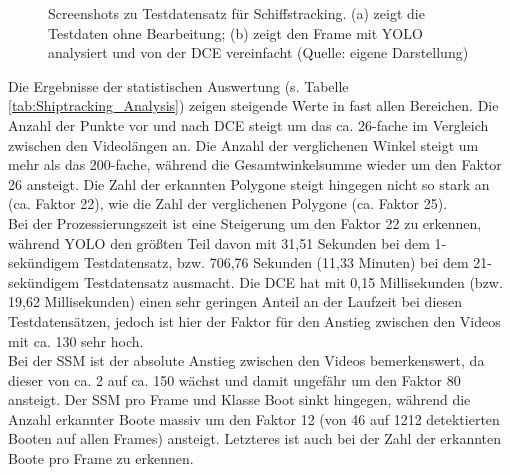 {\begin{figure}[ht]
\begin{subfigure}[b]{0.45\textwidth}
		\end{subfigure}
		\caption[Screenshots zu Testdatensatz für Schiffstracking]{Screenshots zu Testdatensatz für Schiffstracking. (a) zeigt die Testdaten ohne Bearbeitung; (b) zeigt den Frame mit YOLO analysiert und von der DCE vereinfacht (Quelle: eigene Darstellung)}
		\label{Scr:Testdatensatz_Shiptracking}
	\end{figure} 
	Die Ergebnisse der statistischen Auswertung (s. Tabelle \ref{tab:Shiptracking_Analysis}) zeigen steigende Werte in fast allen Bereichen. Die Anzahl der Punkte vor und nach DCE steigt um das ca. 26-fache im Vergleich zwischen den Videolängen an. Die Anzahl der verglichenen Winkel steigt um mehr als das 200-fache, während die Gesamtwinkelsumme wieder um den Faktor 26  ansteigt. Die Zahl der erkannten Polygone steigt hingegen nicht so stark an (ca. Faktor 22), wie die Zahl der verglichenen Polygone (ca. Faktor 25). \\
	Bei der Prozessierungszeit ist eine Steigerung um den Faktor 22 zu erkennen, während YOLO den größten Teil davon mit 31,51 Sekunden bei dem 1-sekündigem Testdatensatz, bzw. 706,76 Sekunden (11,33 Minuten) bei dem 21-sekündigem Testdatensatz ausmacht. Die DCE hat mit 0,15 Millisekunden (bzw. 19,62 Millisekunden) einen sehr geringen Anteil an der Laufzeit bei diesen Testdatensätzen, jedoch ist hier der Faktor für den Anstieg zwischen den Videos mit ca. 130 sehr hoch. \\
	Bei der SSM ist der absolute Anstieg zwischen den Videos bemerkenswert, da dieser von ca. 2 auf ca. 150 wächst und damit ungefähr um den Faktor 80 ansteigt. Der SSM pro Frame und Klasse Boot sinkt hingegen, während die Anzahl erkannter Boote massiv um den Faktor 12 (von 46 auf 1212 detektierten Booten auf allen Frames) ansteigt. Letzteres ist auch bei der Zahl der erkannten Boote pro Frame zu erkennen. \\

}

